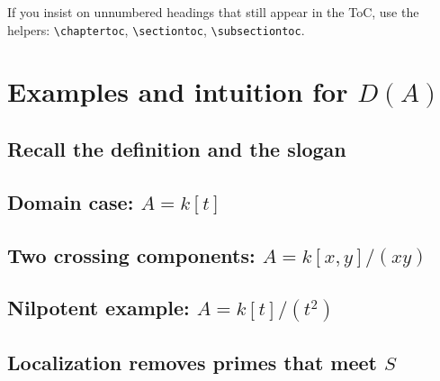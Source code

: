 \documentclass[12pt,a4paper,oneside]{report}
\theoremstyle{notespace}
\newcommand{\chaptertoc}[1]{\chapter*{#1}\addcontentsline{toc}{chapter}{#1}}
\newcommand{\sectiontoc}[1]{\section*{#1}\addcontentsline{toc}{section}{#1}}
\newcommand{\subsectiontoc}[1]{\subsection*{#1}\addcontentsline{toc}{subsection}{#1}}
\begin{document}
\begin{center}
\begin{minipage}{0.92\textwidth}
    If you insist on unnumbered headings that still appear in the ToC, use the helpers:
    \verb|\chaptertoc|, \verb|\sectiontoc|, \verb|\subsectiontoc|.
  \end{minipage}
\end{center}

\tableofcontents
\clearpage


\chapter{Examples and intuition for \(D(A)\)}

\section{Recall the definition and the slogan}

\section{Domain case: \(A=k[t]\)}

\section{Two crossing components: \(A=k[x,y]/(xy)\)}

\section{Nilpotent example: \(A=k[t]/(t^2)\)}

\section{Localization removes primes that meet \(S\)}
\end{document}
